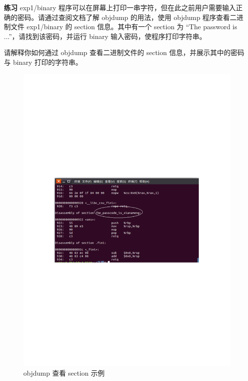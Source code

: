 \begin{mdframed}[hidealllines=true,backgroundcolor=gray!20]
\textbf{练习 }exp1/binary 程序可以在屏幕上打印一串字符，但在此之前用户需要输入正确的密码。请通过查阅文档了解 objdump 的用法，使用 objdump 程序查看二进制文件 exp1/binary 的 section 信息。其中有一个 section 为 “The password is ...”，请找到该密码，并运行 binary 输入密码，使程序打印字符串。

请解释你如何通过 objdump 查看二进制文件的 section 信息，并展示其中的密码与 binary 打印的字符串。
\end{mdframed}

\begin{figure}[htbp]
    \centering
    \includegraphics[width=\textwidth]{img/objdump查看section示例.pdf}
    \caption{objdump 查看 section 示例}
    \label{fig:objdump 查看 section 示例}
\end{figure}


